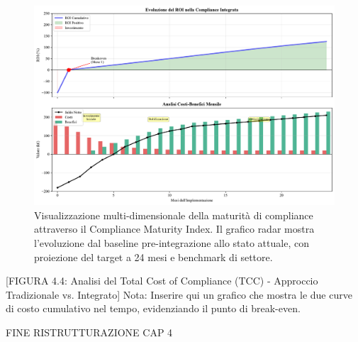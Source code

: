 \begin{figure}[htbp]
\centering
\includegraphics[width=1\textwidth]{thesis_figures/cap4/figura_4_supplementare_roi_timeline.pdf}
\caption{Visualizzazione multi-dimensionale della maturità di compliance attraverso il Compliance Maturity Index. Il grafico radar mostra l'evoluzione dal baseline pre-integrazione allo stato attuale, con proiezione del target a 24 mesi e benchmark di settore.}
\label{fig:supplementare_roi_timeline}
\end{figure}

[FIGURA 4.4: Analisi del Total Cost of Compliance (TCC) - Approccio Tradizionale vs. Integrato]
Nota: Inserire qui un grafico che mostra le due curve di costo cumulativo nel tempo, evidenziando il punto di break-even.

\printbibliography[
    heading=subbibliography, %
]
\endrefsection %


FINE RISTRUTTURAZIONE CAP 4


